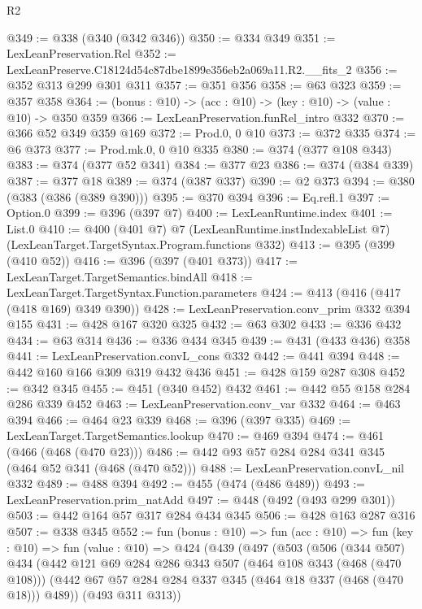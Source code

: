 \begin{lexlean}{R2}
\begin{coremodule}
@349 := @338 (@340 (@342 @346))
@350 := @334 @349
@351 := LexLeanPreservation.Rel
@352 := LexLeanPreserve.C18124d54c87dbe1899e356eb2a069a11.R2.__fits_2
@356 := @352 @313 @299 @301 @311
@357 := @351 @356
@358 := @63 @323
@359 := @357 @358
@364 := (bonus : @10) -> (acc : @10) -> (key : @10) -> (value : @10) -> @350 @359
@366 := LexLeanPreservation.funRel_intro @332
@370 := @366 @52 @349 @359 @169
@372 := Prod.{0, 0} @10
@373 := @372 @335
@374 := @6 @373
@377 := Prod.mk.{0, 0} @10 @335
@380 := @374 (@377 @108 @343)
@383 := @374 (@377 @52 @341)
@384 := @377 @23
@386 := @374 (@384 @339)
@387 := @377 @18
@389 := @374 (@387 @337)
@390 := @2 @373
@394 := @380 (@383 (@386 (@389 @390)))
@395 := @370 @394
@396 := Eq.refl.{1}
@397 := Option.{0}
@399 := @396 (@397 @7)
@400 := LexLeanRuntime.index
@401 := List.{0}
@410 := @400
    (@401 @7)
    @7
    (LexLeanRuntime.instIndexableList @7)
    (LexLeanTarget.TargetSyntax.Program.functions @332)
@413 := @395 (@399 (@410 @52))
@416 := @396 (@397 (@401 @373))
@417 := LexLeanTarget.TargetSemantics.bindAll
@418 := LexLeanTarget.TargetSyntax.Function.parameters
@424 := @413 (@416 (@417 (@418 @169) @349 @390))
@428 := LexLeanPreservation.conv_prim @332 @394 @155
@431 := @428 @167 @320 @325
@432 := @63 @302
@433 := @336 @432
@434 := @63 @314
@436 := @336 @434 @345
@439 := @431 (@433 @436) @358
@441 := LexLeanPreservation.convL_cons @332
@442 := @441 @394
@448 := @442 @160 @166 @309 @319 @432 @436
@451 := @428 @159 @287 @308
@452 := @342 @345
@455 := @451 (@340 @452) @432
@461 := @442 @55 @158 @284 @286 @339 @452
@463 := LexLeanPreservation.conv_var @332
@464 := @463 @394
@466 := @464 @23 @339
@468 := @396 (@397 @335)
@469 := LexLeanTarget.TargetSemantics.lookup
@470 := @469 @394
@474 := @461 (@466 (@468 (@470 @23)))
@486 := @442 @93 @57 @284 @284 @341 @345 (@464 @52 @341 (@468 (@470 @52)))
@488 := LexLeanPreservation.convL_nil @332
@489 := @488 @394
@492 := @455 (@474 (@486 @489))
@493 := LexLeanPreservation.prim_natAdd
@497 := @448 (@492 (@493 @299 @301))
@503 := @442 @164 @57 @317 @284 @434 @345
@506 := @428 @163 @287 @316
@507 := @338 @345
@552 := fun (bonus : @10) =>
  fun (acc : @10) =>
  fun (key : @10) =>
  fun (value : @10) =>
  @424
    (@439
      (@497
        (@503
          (@506
            (@344 @507)
            @434
            (@442
              @121
              @69
              @284
              @286
              @343
              @507
              (@464 @108 @343 (@468 (@470 @108)))
              (@442 @67 @57 @284 @284 @337 @345 (@464 @18 @337 (@468 (@470 @18))) @489))
            (@493 @311 @313))

\end{coremodule}
\end{lexlean}
